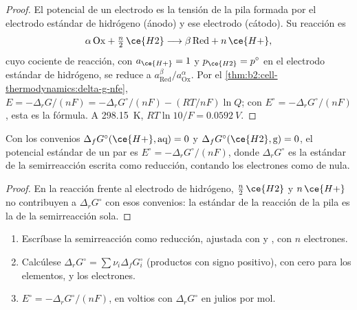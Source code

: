 \begin{proof}
El potencial de un electrodo es la tensión de la pila formada por el electrodo
estándar de hidrógeno (ánodo) y ese electrodo (cátodo). Su reacción es
\[
  \alpha\,\mathrm{Ox} + \tfrac n2\,\ce{H2} \longrightarrow \beta\,\mathrm{Red} + n\,\ce{H+} ,
\]
cuyo cociente de reacción, con $a_{\ce{H+}} = 1$ y $p_{\ce{H2}} = p^\circ$ en
el electrodo estándar de hidrógeno, se reduce a $a_{\mathrm{Red}}^\beta/
a_{\mathrm{Ox}}^\alpha$. Por el \cref{thm:b2:cell-thermodynamics:delta-g-nfe},
$E = -\Delta_r G/(nF) = -\Delta_r G^\circ/(nF) - (RT/nF)\ln Q$; con $E^\circ =
-\Delta_r G^\circ/(nF)$, esta es la fórmula. A \qty{298.15}{K}, $RT\ln 10/F =
\qty{0.0592}{V}$.
\end{proof}

\begin{proposition}\label{prop:b2:cell-thermodynamics:standard-potential}
Con los convenios $\Delta_f G^\circ(\ce{H+}, \text{aq}) = 0$ y
$\Delta_f G^\circ(\ce{H2}, \text{g}) = 0$, el potencial estándar de un par es
$E^\circ = -\Delta_r G^\circ/(nF)$, donde $\Delta_r G^\circ$ es la 
estándar de la semirreacción escrita como reducción, contando los electrones como
de  nula.
\end{proposition}

\begin{proof}
En la reacción frente al electrodo de hidrógeno, $\tfrac n2\,\ce{H2}$ y
$n\,\ce{H+}$ no contribuyen a $\Delta_r G^\circ$ con esos convenios: la
 estándar de la reacción de la pila es la de la semirreacción sola.
\end{proof}

\begin{method}\label{met:b2:cell-thermodynamics:e-from-gibbs}
\begin{enumerate}
  \item Escríbase la semirreacción como reducción, ajustada con  y
        , con $n$ electrones.
  \item Calcúlese $\Delta_r G^\circ = \sum\nu_i\Delta_f G^\circ_i$ (productos
        con signo positivo), con cero para los elementos,  y los electrones.
  \item $E^\circ = -\Delta_r G^\circ/(nF)$, en voltios con $\Delta_r G^\circ$ en
        julios por mol.
\end{enumerate}
\end{method}

